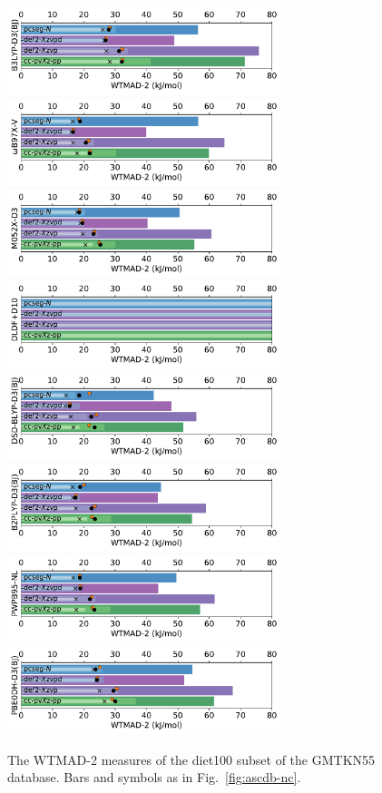 \documentclass[12pt]{article}
\begin{document}
\begin{figure}[p]
    \includegraphics[width=8cm]{../output/fig_gmtkn55_08.pdf}
    \includegraphics[width=8cm]{../output/fig_gmtkn55_09.pdf}
    \includegraphics[width=8cm]{../output/fig_gmtkn55_10.pdf}
    \includegraphics[width=8cm]{../output/fig_gmtkn55_11.pdf}
    \includegraphics[width=8cm]{../output/fig_gmtkn55_12.pdf}
    \includegraphics[width=8cm]{../output/fig_gmtkn55_13.pdf}
    \includegraphics[width=8cm]{../output/fig_gmtkn55_14.pdf}
    \includegraphics[width=8cm]{../output/fig_gmtkn55_15.pdf}
    \caption{The WTMAD-2 measures of the diet100 subset of the GMTKN55 database. Bars and symbols as in Fig.~\ref{fig:ascdb-nc}.}
\end{figure}

\clearpage


\end{document}
